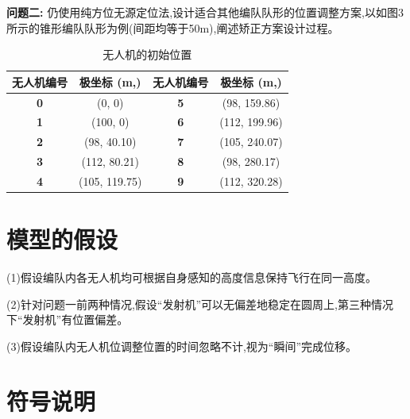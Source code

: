 \documentclass[withoutpreface,bwprint]{cumcmthesis}
\begin{document}
	
	

	
	\noindent\textbf{问题二:}
	仍使用纯方位无源定位法,设计适合其他编队队形的位置调整方案,以如图3所示的锥形编队队形为例(间距均等于50m),阐述矫正方案设计过程。
	
		
	\begin{table}[htbp!]
		\small
		\caption{无人机的初始位置}
		\centering
		\renewcommand\arraystretch{4}
		\tabcolsep=0.6cm
		\begin{tabular}{@{}cccc@{}}
			\toprule
			\textbf{无人机编号} & \textbf{极坐标 (m,\textdegree)} & \textbf{无人机编号} & \textbf{极坐标 (m,\textdegree)} \\ \midrule
			\textbf{0}     & (0, 0)             & \textbf{5}     & (98, 159.86)       \\
			\textbf{1}     & (100, 0)           & \textbf{6}     & (112, 199.96)      \\
			\textbf{2}     & (98, 40.10)        & \textbf{7}     & (105, 240.07)      \\
			\textbf{3}     & (112, 80.21)       & \textbf{8}     & (98, 280.17)       \\
			\textbf{4}     & (105, 119.75)      & \textbf{9}     & (112, 320.28)      \\ \bottomrule
		\end{tabular}
	\end{table}
	
	\section{模型的假设}
	
	(1)假设编队内各无人机均可根据自身感知的高度信息保持飞行在同一高度。
	
	(2)针对问题一前两种情况,假设“发射机”可以无偏差地稳定在圆周上,第三种情况下“发射机”有位置偏差。
	
	(3)假设编队内无人机位调整位置的时间忽略不计,视为“瞬间”完成位移。
	
	\section{符号说明}
	
\end{document}
